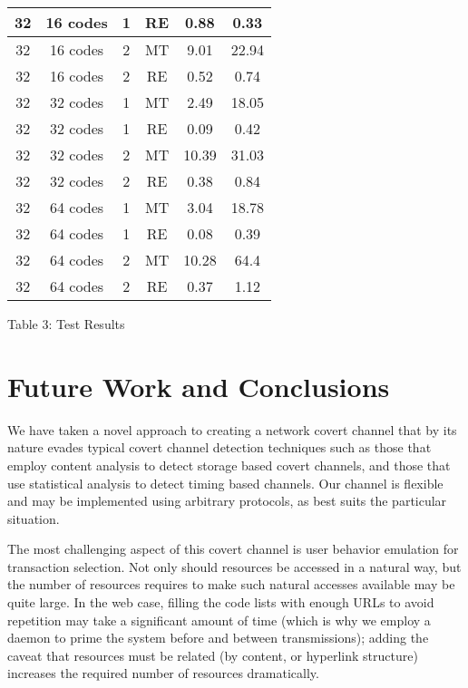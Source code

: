 \documentclass[10pt, conference]{IEEEtran}
\begin{document}
\begin{table*}[ht]
\begin{tabular}{| c | c | c | c | c | c |}
    32 & 16 codes  & 1 & RE & 0.88 & 0.33 \\ \hline
    32 & 16 codes  & 2 & MT & 9.01 & 22.94 \\ \hline
    32 & 16 codes  & 2 & RE & 0.52 & 0.74 \\ \hline
    32 & 32 codes  & 1 & MT & 2.49 & 18.05 \\ \hline
    32 & 32 codes  & 1 & RE & 0.09 & 0.42 \\ \hline
    32 & 32 codes  & 2 & MT & 10.39 & 31.03 \\ \hline
    32 & 32 codes  & 2 & RE & 0.38 & 0.84 \\ \hline
    32 & 64 codes  & 1 & MT & 3.04 & 18.78 \\ \hline
    32 & 64 codes  & 1 & RE & 0.08 & 0.39 \\ \hline
    32 & 64 codes  & 2 & MT & 10.28 & 64.4 \\ \hline
    32 & 64 codes  & 2 & RE & 0.37 & 1.12 \\ \hline
  \end{tabular}
  \begin{center}Table 3: Test Results \end{center}
\end{table*}

\section{Future Work and Conclusions}

We have taken a novel approach to creating a network covert channel that by its nature evades typical covert channel detection techniques such as those that employ content analysis to detect storage based covert channels, and those that use statistical analysis to detect timing based channels.   Our channel is flexible and may be implemented using arbitrary protocols, as best suits the particular situation.

The most challenging aspect of this covert channel is user behavior emulation for transaction selection.  Not only should resources be accessed in a natural way, but the number of resources requires to make such natural accesses available may be quite large.  In the web case, filling the code lists with enough URLs to avoid repetition may take a significant amount of time (which is why we employ a daemon to prime the system before and between transmissions); adding the caveat that resources must be related (by content, or hyperlink structure) increases the required number of resources dramatically.
\end{document}
